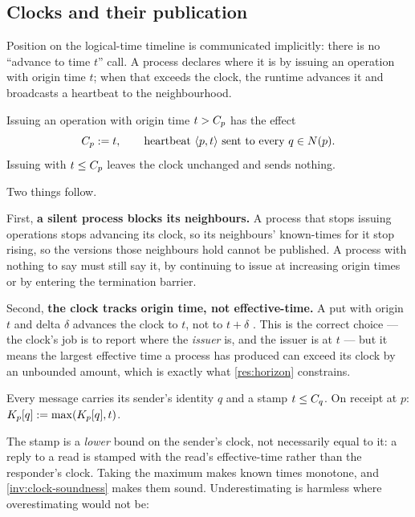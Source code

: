 \subsection{Clocks and their publication}
\label{sec:exec-clocks}

Position on the \gls{logical-time} timeline is communicated implicitly: there
is no ``advance to time $t$'' call. A process declares where it is by issuing
an operation with origin time $t$; when that exceeds the clock, the runtime
advances it and broadcasts a heartbeat to the \gls{neighbourhood}.

\begin{definition}\label{def:clock-advance}
Issuing an operation with origin time $t > C_{p}$ has the effect
\[
  C_{p} \mathrel{{:}{=}} t,
  \qquad
  \text{heartbeat } \langle p, t \rangle \text{ sent to every } q \in N(p).
\]
Issuing with $t \le C_{p}$ leaves the clock unchanged and sends nothing.
\end{definition}

Two things follow.

First, \textbf{a silent process blocks its neighbours.} A process that stops issuing
operations stops advancing its clock, so its neighbours' \glspl{known-time} for it
stop rising, so the \glspl{version} those neighbours hold cannot be published. A process
with nothing to say must still say it, by continuing to issue at increasing
origin times or by entering the \gls{termination} barrier.

Second, \textbf{the clock tracks origin time, not \gls{effective-time}.} A put with
origin $t$ and \gls{delta} $\delta$ advances the clock to $t$, not to $t+\delta$
. This is the correct choice --- the clock's job
is to report where the \emph{issuer} is, and the issuer is at $t$ --- but it
means the largest effective time a process has produced can exceed its clock by
an unbounded amount, which is exactly what \cref{res:horizon} constrains.

\begin{definition}\label{def:known-update}
Every message carries its sender's identity $q$ and a stamp $t \le C_{q}$.
On receipt at $p$: $K_{p}[q] \mathrel{{:}{=}} \max(K_{p}[q], t)$.
\end{definition}

The stamp is a \emph{lower} bound on the sender's clock, not necessarily equal
to it: a reply to a read is stamped with the read's \gls{effective-time}
rather than the responder's clock. Taking the maximum makes known times
monotone, and \cref{inv:clock-soundness} makes them sound. Underestimating is
harmless where overestimating would not be:

